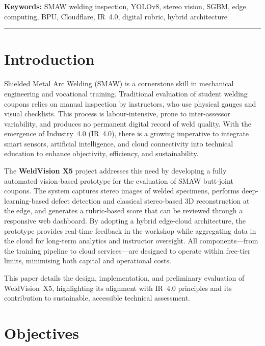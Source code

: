 \documentclass[12pt,a4paper]{article}
\begin{document}
\noindent\textbf{Keywords:} SMAW welding inspection, YOLOv8, stereo vision, SGBM, edge computing,
BPU, Cloudflare, IR~4.0, digital rubric, hybrid architecture

\vspace{4pt}
\noindent\rule{\linewidth}{0.5pt}
\vspace{4pt}

\section{Introduction}

Shielded Metal Arc Welding (SMAW) is a cornerstone skill in mechanical engineering and vocational training.
Traditional evaluation of student welding coupons relies on manual inspection by instructors, who use physical
gauges and visual checklists. This process is labour-intensive, prone to inter-assessor variability, and
produces no permanent digital record of weld quality. With the emergence of Industry~4.0 (IR~4.0), there is a
growing imperative to integrate smart sensors, artificial intelligence, and cloud connectivity into technical
education to enhance objectivity, efficiency, and sustainability.

The \textbf{WeldVision X5} project addresses this need by developing a fully automated vision-based prototype
for the evaluation of SMAW butt-joint coupons. The system captures stereo images of welded specimens,
performs deep-learning-based defect detection and classical stereo-based 3D reconstruction at the edge, and
generates a rubric-based score that can be reviewed through a responsive web dashboard. By adopting a hybrid
edge-cloud architecture, the prototype provides real-time feedback in the workshop while aggregating data in
the cloud for long-term analytics and instructor oversight. All components---from the training pipeline to cloud
services---are designed to operate within free-tier limits, minimising both capital and operational costs.

This paper details the design, implementation, and preliminary evaluation of WeldVision~X5, highlighting its
alignment with IR~4.0 principles and its contribution to sustainable, accessible technical assessment.

\section{Objectives}
\end{document}
